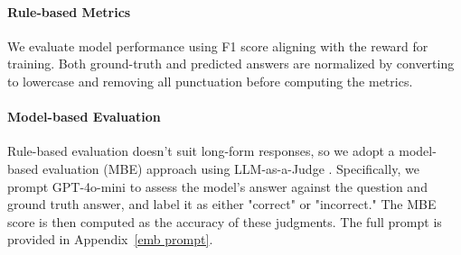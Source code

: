 \documentclass{article}
\begin{document}
\paragraph{Rule-based Metrics}
We evaluate model performance using F1 score aligning with the reward for training. Both ground-truth and predicted answers are normalized by converting to lowercase and removing all punctuation before computing the metrics.

\paragraph{Model-based Evaluation}
Rule-based evaluation doesn't suit long-form responses, so we adopt a model-based evaluation (MBE) approach using LLM-as-a-Judge \cite{DBLP:conf/nips/ZhengC00WZL0LXZ23}. Specifically, we prompt GPT-4o-mini \cite{hurst2024gpt} to assess the model's answer against the question and ground truth answer, and label it as either "correct" or "incorrect." The MBE score is then computed as the accuracy of these judgments.\cite{DBLP:conf/nips/ZhengC00WZL0LXZ23} The full prompt is provided in Appendix~\ref{emb prompt}.
\end{document}

